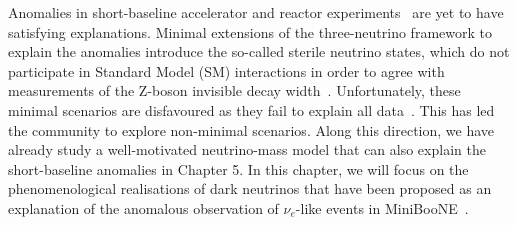 \graphicspath{{}{miniboone/figs/}{miniboone/}{Diagrams/}}

Anomalies in short-baseline accelerator and reactor experiments~\cite{Athanassopoulos:1996jb,Aguilar:2001ty,AguilarArevalo:2007it,Aguilar-Arevalo:2018gpe} are yet to have satisfying explanations. Minimal extensions of the three-neutrino framework to explain the anomalies introduce the so-called sterile neutrino states, which do not participate in Standard Model (SM) interactions in order to agree with measurements of the Z-boson invisible decay width~\cite{ALEPH:2010aa}. Unfortunately, these minimal scenarios are disfavoured as they fail to explain all data~\cite{Collin:2016aqd, Capozzi:2016vac, Dentler:2018sju}. This has led the community to explore non-minimal scenarios. Along this direction, we have already study a well-motivated neutrino-mass model that can also explain the short-baseline anomalies in Chapter 5. In this chapter, we will focus on the phenomenological realisations of dark neutrinos that have been proposed as an explanation of the anomalous observation of $\nu_e$-like events in MiniBooNE~\cite{Aguilar-Arevalo:2018gpe}.

